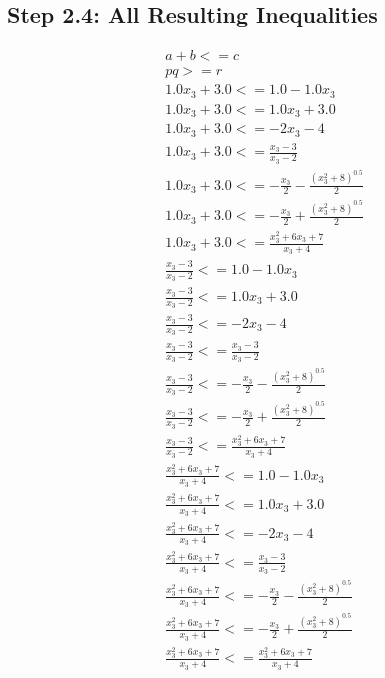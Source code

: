 \documentclass{article}
\begin{document}
\subsection{Step 2.4: All Resulting Inequalities}

\begin{align}
& a + b <= c \\
& p q >= r \\
& 1.0 x_{3} + 3.0 <= 1.0 - 1.0 x_{3} \\
& 1.0 x_{3} + 3.0 <= 1.0 x_{3} + 3.0 \\
& 1.0 x_{3} + 3.0 <= - 2 x_{3} - 4 \\
& 1.0 x_{3} + 3.0 <= \frac{x_{3} - 3}{x_{3} - 2} \\
& 1.0 x_{3} + 3.0 <= - \frac{x_{3}}{2} - \frac{\left(x_{3}^{2} + 8\right)^{0.5}}{2} \\
& 1.0 x_{3} + 3.0 <= - \frac{x_{3}}{2} + \frac{\left(x_{3}^{2} + 8\right)^{0.5}}{2} \\
& 1.0 x_{3} + 3.0 <= \frac{x_{3}^{2} + 6 x_{3} + 7}{x_{3} + 4} \\
& \frac{x_{3} - 3}{x_{3} - 2} <= 1.0 - 1.0 x_{3} \\
& \frac{x_{3} - 3}{x_{3} - 2} <= 1.0 x_{3} + 3.0 \\
& \frac{x_{3} - 3}{x_{3} - 2} <= - 2 x_{3} - 4 \\
& \frac{x_{3} - 3}{x_{3} - 2} <= \frac{x_{3} - 3}{x_{3} - 2} \\
& \frac{x_{3} - 3}{x_{3} - 2} <= - \frac{x_{3}}{2} - \frac{\left(x_{3}^{2} + 8\right)^{0.5}}{2} \\
& \frac{x_{3} - 3}{x_{3} - 2} <= - \frac{x_{3}}{2} + \frac{\left(x_{3}^{2} + 8\right)^{0.5}}{2} \\
& \frac{x_{3} - 3}{x_{3} - 2} <= \frac{x_{3}^{2} + 6 x_{3} + 7}{x_{3} + 4} \\
& \frac{x_{3}^{2} + 6 x_{3} + 7}{x_{3} + 4} <= 1.0 - 1.0 x_{3} \\
& \frac{x_{3}^{2} + 6 x_{3} + 7}{x_{3} + 4} <= 1.0 x_{3} + 3.0 \\
& \frac{x_{3}^{2} + 6 x_{3} + 7}{x_{3} + 4} <= - 2 x_{3} - 4 \\
& \frac{x_{3}^{2} + 6 x_{3} + 7}{x_{3} + 4} <= \frac{x_{3} - 3}{x_{3} - 2} \\
& \frac{x_{3}^{2} + 6 x_{3} + 7}{x_{3} + 4} <= - \frac{x_{3}}{2} - \frac{\left(x_{3}^{2} + 8\right)^{0.5}}{2} \\
& \frac{x_{3}^{2} + 6 x_{3} + 7}{x_{3} + 4} <= - \frac{x_{3}}{2} + \frac{\left(x_{3}^{2} + 8\right)^{0.5}}{2} \\
& \frac{x_{3}^{2} + 6 x_{3} + 7}{x_{3} + 4} <= \frac{x_{3}^{2} + 6 x_{3} + 7}{x_{3} + 4}
\end{align}
\end{document}
